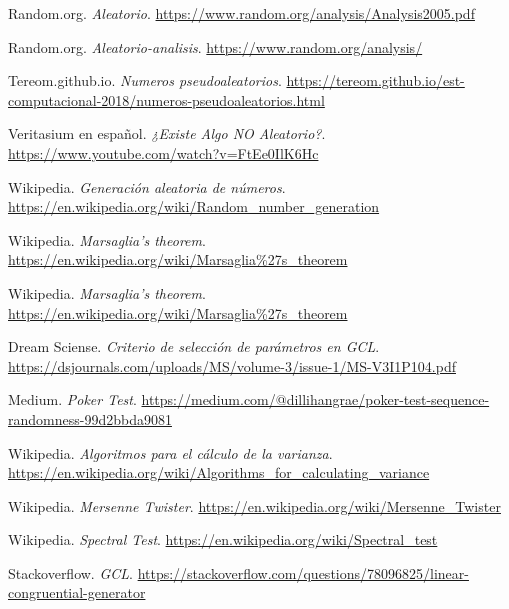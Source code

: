\documentclass{article}
\begin{document}
\begin{enumerate}[label={[\arabic*]}, leftmargin=*]
    \item Random.org. \textit{Aleatorio}. 
    \url{https://www.random.org/analysis/Analysis2005.pdf}

    \item Random.org. \textit{Aleatorio-analisis}. 
    \url{https://www.random.org/analysis/}

    \item Tereom.github.io. \textit{Numeros pseudoaleatorios}. 
    \url{https://tereom.github.io/est-computacional-2018/numeros-pseudoaleatorios.html}

    \item Veritasium en español. \textit{¿Existe Algo NO Aleatorio?}. 
    \url{https://www.youtube.com/watch?v=FtEe0IlK6Hc}

    \item Wikipedia. \textit{Generación aleatoria de números}. 
    \url{https://en.wikipedia.org/wiki/Random_number_generation}

    \item Wikipedia. \textit{Marsaglia's theorem}. 
    \url{https://en.wikipedia.org/wiki/Marsaglia%27s_theorem}

    \item Wikipedia. \textit{Marsaglia's theorem}. 
    \url{https://en.wikipedia.org/wiki/Marsaglia%27s_theorem}

    \item Dream Sciense. \textit{Criterio de selección de parámetros en GCL}. 
    \url{https://dsjournals.com/uploads/MS/volume-3/issue-1/MS-V3I1P104.pdf}

    \item Medium. \textit{Poker Test}. 
    \url{https://medium.com/@dillihangrae/poker-test-sequence-randomness-99d2bbda9081}

    \item Wikipedia. \textit{Algoritmos para el cálculo de la varianza}. 
    \url{https://en.wikipedia.org/wiki/Algorithms_for_calculating_variance}

    \item Wikipedia. \textit{Mersenne Twister}. 
    \url{https://en.wikipedia.org/wiki/Mersenne_Twister}

    \item Wikipedia. \textit{Spectral Test}. 
    \url{https://en.wikipedia.org/wiki/Spectral_test}

    \item Stackoverflow. \textit{GCL}. 
    \url{https://stackoverflow.com/questions/78096825/linear-congruential-generator}

\end{enumerate}
\end{document}
